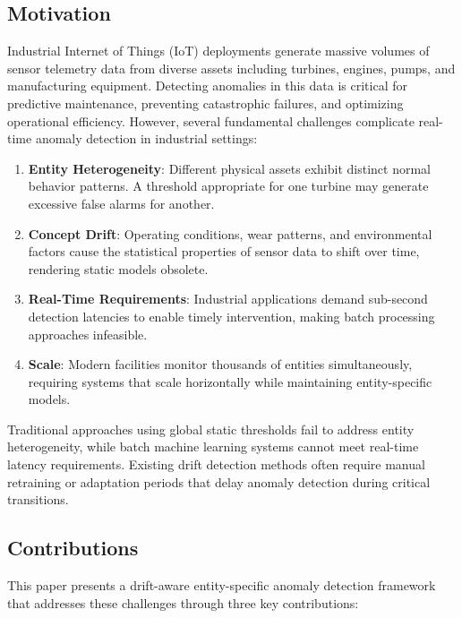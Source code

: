 \documentclass[conference]{IEEEtran}
\begin{document}
\subsection{Motivation}

Industrial Internet of Things (IoT) deployments generate massive volumes of sensor telemetry data from diverse assets including turbines, engines, pumps, and manufacturing equipment. Detecting anomalies in this data is critical for predictive maintenance, preventing catastrophic failures, and optimizing operational efficiency. However, several fundamental challenges complicate real-time anomaly detection in industrial settings:

\begin{enumerate}
\item \textbf{Entity Heterogeneity}: Different physical assets exhibit distinct normal behavior patterns. A threshold appropriate for one turbine may generate excessive false alarms for another.

\item \textbf{Concept Drift}: Operating conditions, wear patterns, and environmental factors cause the statistical properties of sensor data to shift over time, rendering static models obsolete.

\item \textbf{Real-Time Requirements}: Industrial applications demand sub-second detection latencies to enable timely intervention, making batch processing approaches infeasible.

\item \textbf{Scale}: Modern facilities monitor thousands of entities simultaneously, requiring systems that scale horizontally while maintaining entity-specific models.
\end{enumerate}

Traditional approaches using global static thresholds fail to address entity heterogeneity, while batch machine learning systems cannot meet real-time latency requirements. Existing drift detection methods often require manual retraining or adaptation periods that delay anomaly detection during critical transitions.

\subsection{Contributions}

This paper presents a drift-aware entity-specific anomaly detection framework that addresses these challenges through three key contributions:
\end{document}
